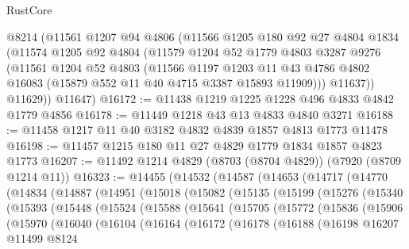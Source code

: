 \begin{lexlean}{RustCore}
\begin{coremodule}
      @8214
      (@11561
        @1207
        @94
        @4806
        (@11566
          @1205
          @180
          @92
          @27
          @4804
          @1834
          (@11574
            @1205
            @92
            @4804
            (@11579
              @1204
              @52
              @1779
              @4803
              @3287
              @9276
              (@11561
                @1204
                @52
                @4803
                (@11566
                  @1197
                  @1203
                  @11
                  @43
                  @4786
                  @4802
                  @16083
                  (@15879 @552 @11 @40 @4715 @3387 @15893 @11909)))
              @11637))
          @11629))
      @11647)
@16172 := @11438 @1219 @1225 @1228 @496 @4833 @4842 @1779 @4856
@16178 := @11449 @1218 @43 @13 @4833 @4840 @3271
@16188 := @11458 @1217 @11 @40 @3182 @4832 @4839 @1857 @4813 @1773 @11478
@16198 := @11457 @1215 @180 @11 @27 @4829 @1779 @1834 @1857 @4823 @1773
@16207 := @11492 @1214 @4829 (@8703 (@8704 @4829)) (@7920 (@8709 @1214 @11))
@16323 := @14455
    (@14532
      (@14587
        (@14653
          (@14717
            (@14770
              (@14834
                (@14887
                  (@14951
                    (@15018
                      (@15082
                        (@15135
                          (@15199
                            (@15276
                              (@15340
                                (@15393
                                  (@15448
                                    (@15524
                                      (@15588
                                        (@15641
                                          (@15705
                                            (@15772
                                              (@15836
                                                (@15906
                                                  (@15970
                                                    (@16040
                                                      (@16104
                                                        (@16164
                                                          (@16172
                                                            (@16178
                                                              (@16188
                                                                (@16198
                                                                  @16207
                                                                  @11499
                                                                  @8124

\end{coremodule}
\end{lexlean}
